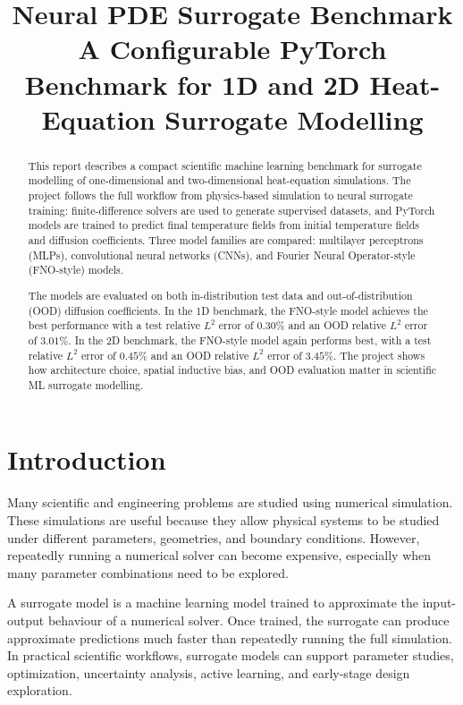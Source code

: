 \documentclass[11pt,a4paper]{article}
\title{
    \textbf{Neural PDE Surrogate Benchmark}\\
    \large A Configurable PyTorch Benchmark for 1D and 2D Heat-Equation Surrogate Modelling
}
\date{}
\begin{document}
\maketitle

\begin{abstract}
This report describes a compact scientific machine learning benchmark for surrogate modelling of one-dimensional and two-dimensional heat-equation simulations. The project follows the full workflow from physics-based simulation to neural surrogate training: finite-difference solvers are used to generate supervised datasets, and PyTorch models are trained to predict final temperature fields from initial temperature fields and diffusion coefficients. Three model families are compared: multilayer perceptrons (MLPs), convolutional neural networks (CNNs), and Fourier Neural Operator-style (FNO-style) models.

The models are evaluated on both in-distribution test data and out-of-distribution (OOD) diffusion coefficients. In the 1D benchmark, the FNO-style model achieves the best performance with a test relative \(L^2\) error of \(0.30\%\) and an OOD relative \(L^2\) error of \(3.01\%\). In the 2D benchmark, the FNO-style model again performs best, with a test relative \(L^2\) error of \(0.45\%\) and an OOD relative \(L^2\) error of \(3.45\%\). The project shows how architecture choice, spatial inductive bias, and OOD evaluation matter in scientific ML surrogate modelling.
\end{abstract}



\section{Introduction}

Many scientific and engineering problems are studied using numerical simulation. These simulations are useful because they allow physical systems to be studied under different parameters, geometries, and boundary conditions. However, repeatedly running a numerical solver can become expensive, especially when many parameter combinations need to be explored.

A surrogate model is a machine learning model trained to approximate the input-output behaviour of a numerical solver. Once trained, the surrogate can produce approximate predictions much faster than repeatedly running the full simulation. In practical scientific workflows, surrogate models can support parameter studies, optimization, uncertainty analysis, active learning, and early-stage design exploration.
\end{document}
